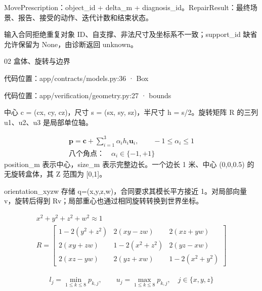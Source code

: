\documentclass[10pt,a4paper]{article}
\begin{document}
MovePrescription：object\_id + delta\_m + diagnosis\_id。RepairResult：最终场景、报告、接受的动作、迭代计数和结束状态。\par
{\footnotesize\color{ink} 输入合同拒绝重复对象 ID、自支撑、非法尺寸及坐标系不一致；support\_id 缺省允许保留为 None，由诊断返回 unknown。\par}
\clearpage
{\color{ink}\LARGE 02 盒体、旋转与边界\par}\vspace{5pt}
{\footnotesize\color{ink} 代码位置：app/contracts/models.py:36 · Box\par}
{\footnotesize\color{ink} 代码位置：app/verification/geometry.py:27 · bounds\par}
\par{}
中心 c = (cx, cy, cz)，尺寸 s = (sx, sy, sz)，半尺寸 h = s/2。旋转矩阵 R 的三列 u1、u2、u3 是局部单位轴。\par
\[\begin{gathered}\mathbf p=\mathbf c+\sum_{i=1}^{3}\alpha_i h_i\mathbf u_i,\qquad -1\le\alpha_i\le1\\ \text{八个角点：}\quad \alpha_i\in\{-1,+1\}\end{gathered}\]
position\_m 表示中心，size\_m 表示完整边长。一个边长 1 米、中心 (0,0,0.5) 的无旋转盒体，其 Z 范围为 [0,1]。\par
\par{}
orientation\_xyzw 存储 q=(x,y,z,w)，合同要求其模长平方接近 1。对局部向量 v，旋转后得到 Rv；局部重心也通过相同旋转转换到世界坐标。\par
\[\begin{gathered}x^2+y^2+z^2+w^2\approx1\\ R=\begin{bmatrix}1-2(y^2+z^2)&2(xy-zw)&2(xz+yw)\\2(xy+zw)&1-2(x^2+z^2)&2(yz-xw)\\2(xz-yw)&2(yz+xw)&1-2(x^2+y^2)\end{bmatrix}\end{gathered}\]
\par{}
\[\begin{gathered}l_j=\min_{1\le k\le8}p_{k,j},\qquad u_j=\max_{1\le k\le8}p_{k,j},\quad j\in\{x,y,z\}\end{gathered}\]
\end{document}
